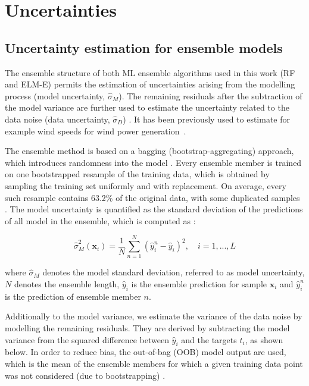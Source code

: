 \section{Uncertainties}
\subsection{Uncertainty estimation for ensemble models}
\label{unc_ML}

The ensemble structure of both ML ensemble algorithms used in this work (RF and ELM-E) permits the estimation of uncertainties arising from the modelling process (model uncertainty, $\hat{\sigma}_M$). The remaining residuals after the subtraction of the model variance are further used to estimate the uncertainty related to the data noise (data uncertainty, $\hat{\sigma}_D$) \cite{akusok_per-sample_2019,guignard_uncertainty_2020}. 
It has been previously used to estimate for example wind speeds for wind power generation~\cite{wan_probabilistic_2014}.

The ensemble method is based on a bagging (bootstrap-aggregating) approach, which introduces randomness into the model  \cite{breiman_bagging_1996}.
Every ensemble member is trained on one bootstrapped resample of the training data, which is
obtained by sampling the training set uniformly and with replacement.
On average, every such resample contains 63.2\% of the original data, with some duplicated samples \cite{breiman_bagging_1996}. 
The model uncertainty is quantified as the standard deviation of the predictions of all model in the ensemble, which is computed as \cite{heskes_practical_1997}:

\begin{equation}
\label{eq:model_unc}
  \hat{\sigma}_M^2 (\mathbf{x}_i) = \frac{1}{N} \sum_{n=1}^N (\hat{y}_i^n - \hat{y}_i)^2, \quad i=1,...,L
\end{equation}

where $\hat{\sigma}_M$ denotes the model standard deviation, referred to as model uncertainty, $N$ denotes the ensemble length, $\hat{y}_i$ is the ensemble prediction for sample $\mathbf{x}_i$ and $\hat{y}_i^n$ is the prediction of ensemble member $n$.

Additionally to the model variance, we estimate the variance of the data noise by modelling the remaining residuals. They are derived by subtracting the model variance from the squared difference between $\hat{y}_i$ and the targets $t_i$, as shown below.
In order to reduce bias, the out-of-bag (OOB) model output are used, which is the mean of the ensemble members for which a given training data point was not considered (due to bootstrapping) \cite{heskes_practical_1997}. 


